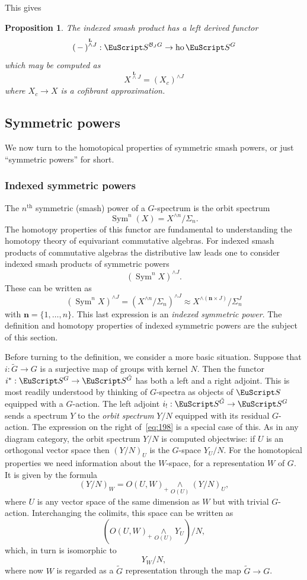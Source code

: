 \documentclass{amsart}
\newtheorem{prop}[equation]{Proposition}
\theoremstyle{definition}
\theoremstyle{remark}
\newcommand{\slot}{\,-\,}
\DeclareMathOperator{\sym}{Sym}
\newcommand{\spectra}{\EuScript S}
\DeclareMathOperator{\ho}{ho}
\newcommand{\ugspectra}[1]{\spectra^{#1}}
\newcommand{\cat}[1]{{\mathcal #1}}
\newcommand{\lder}{\mathbf{L}}
\newcommand{\lwedge}{\overset{\lder}{\wedge}}
\begin{document}
This gives

\begin{prop}
\label{thm:199} 
The indexed smash product has a left derived functor 
\[
(\slot)^{\lwedge J}:\spectra^{\cat{B}_{J}G} \to \ho\ugspectra{G} 
\]
which may be computed as 
\[
X^{\lwedge J}= 
(X_{c})^{\wedge J}
\]
where $X_{c}\to X$ is a cofibrant approximation. 
\end{prop}

\subsection{Symmetric powers}
\label{sec:symmetric-powers}

We now turn to the homotopical properties of symmetric smash powers,
or just ``symmetric powers'' for short.

\subsubsection{Indexed symmetric powers}
\label{sec:index-symm-powers}

The $n^{\text{th}}$ symmetric (smash) power of a $G$-spectrum is the
orbit spectrum 
\[
\sym^{n}(X) = X^{\wedge n}/\Sigma_{n}.
\]
The homotopy properties of this functor are fundamental to
understanding the homotopy theory of equivariant commutative algebras.
For indexed smash products of commutative algebras the distributive
law leads one to consider indexed smash products of symmetric powers
\[
(\sym^{n}X)^{\wedge J}.
\]
These can be written as
\begin{equation}
\label{eq:198}
(\sym^{n}X)^{\wedge J} = (X^{\wedge n}/\Sigma_{n})^{\wedge J} \approx
X^{\wedge (\mathbf{n}\times J)}/\Sigma_{n}^{J}
\end{equation}
with $\mathbf n=\{1,\dots,n \}$.  This last expression is an {\em
indexed symmetric power}.  The definition and homotopy properties of
indexed symmetric powers are the subject of this section.

Before turning to the definition, we consider a more basic
situation.  Suppose that $i:\tilde G\to G$ is a surjective map of
groups with kernel $N$.  Then the functor $i^{\ast}:\ugspectra{G}\to
\ugspectra{\tilde G}$ has both a left and a right adjoint.  This is
most readily understood by thinking of $G$-spectra as objects of
$\spectra$ equipped with a $G$-action.  The left adjoint
$i_{!}:\ugspectra{\tilde G}\to \ugspectra{G}$ sends a spectrum $Y$ to
the {\em orbit spectrum} $Y/N$ equipped with its residual $G$-action.
The expression on the right of~\eqref{eq:198} is a special case of
this.  As in any diagram category, the orbit spectrum $Y/N$ is
computed objectwise: if $U$ is an orthogonal vector space then
$(Y/N)_{U}$ is the $G$-space $Y_{U}/N$.  For the homotopical
properties we need information about the $W$-space, for a
representation $W$ of $G$.  It is given by the formula
\[
(Y/N)_{W} = O(U,W)_{+}\underset{O(U)}{\wedge}(Y/N)_{U},
\]
where $U$ is any vector space of the same dimension as $W$ but with
trivial $G$-action.  Interchanging the colimits, this space can be
written as
\[
(O(U,W)_{+}\underset{O(U)}{\wedge}Y_{U})/N, 
\]
which, in turn is isomorphic to 
\[
Y_{W}/N,
\]
where now $W$ is regarded as a $\tilde G$ representation through the
map $\tilde G\to G$.   
\end{document}
